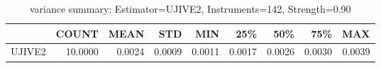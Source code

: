 \begin{table}[ht]
\centering
\caption{variance summary: Estimator=UJIVE2, Instruments=142, Strength=0.90}
\begin{tabular}{lrrrrrrrr}
\toprule
 & COUNT & MEAN & STD & MIN & 25\% & 50\% & 75\% & MAX \\
\midrule
UJIVE2 & 10.0000 & 0.0024 & 0.0009 & 0.0011 & 0.0017 & 0.0026 & 0.0030 & 0.0039 \\
\bottomrule
\end{tabular}
\end{table}
